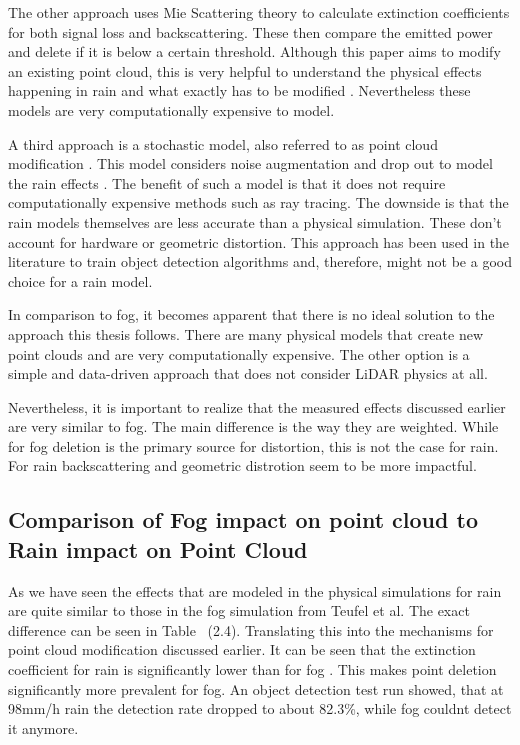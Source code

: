 The other approach uses Mie Scattering theory to calculate extinction coefficients for both signal loss and backscattering. These then compare the emitted power and delete if it is below a certain threshold. Although this paper aims to modify an existing point cloud, this is very helpful to understand the physical effects happening in rain and what exactly has to be modified \cite{haider_methodology_2023}. 
Nevertheless these models are very computationally expensive to model. 

A third approach is a stochastic model, also referred to as point cloud modification \cite {teufel_enhancing_2023}. This model considers noise augmentation and drop out to model the rain effects \cite{teufel_enhancing_2023}. The benefit of such a model is that it does not require computationally expensive methods such as ray tracing. The downside is that the rain models themselves are less accurate than a physical simulation. These don't account for hardware or geometric distortion. This approach has been used in the literature to train object detection algorithms and, therefore, might not be a good choice for a rain model. 

In comparison to fog, it becomes apparent that there is no ideal solution to the approach this thesis follows. There are many physical models that create new point clouds and are very computationally expensive. The other option is a simple and data-driven approach that does not consider LiDAR physics at all. 

Nevertheless, it is important to realize that the measured effects discussed earlier are very similar to fog. The main difference is the way they are weighted. While for fog deletion is the primary source for distortion, this is not the case for rain. For rain backscattering and geometric distrotion seem to be more impactful. 

\subsection{Comparison of Fog impact on point cloud to Rain impact on Point Cloud }

As we have seen the effects that are modeled in the physical simulations for rain are quite similar to those in the fog simulation from Teufel et al. The exact difference can be seen in Table ~(2.4). Translating this into the mechanisms for point cloud modification discussed earlier. It can be seen that the extinction coefficient for rain is significantly lower than for fog \cite{wojtanowski_comparison_2014}. This makes point deletion significantly more prevalent for fog. An object detection test run showed, that at 98mm/h rain the detection rate dropped to about 82.3\%, while fog couldnt detect it anymore.

